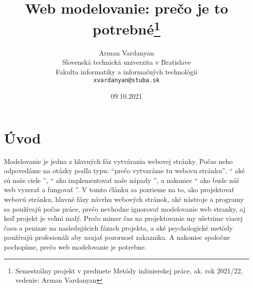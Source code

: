 \documentclass[10pt,twoside,slovak,a4paper]{article}
\title{Web modelovanie: prečo je to potrebné\thanks{Semestrálny projekt v predmete Metódy inžinierskej práce, ak. rok 2021/22, vedenie: Arman Vardanyan}} %
\author{Arman Vardanyan\\[2pt]
	{\small Slovenská technická univerzita v Bratislave}\\
	{\small Fakulta informatiky a informačných technológií}\\
	{\small \texttt{xvardanyan@stuba.sk}}
	}
\date{\small 09.10.2021} %
\begin{document}
\maketitle

\begin{center}
    
\end{center}

\section{Úvod}

Modelovanie je jedna z hlavných fáz vytvárania webovej stránky. Počas neho odpovedáme na otázky podľa typu: “prečo vytvaráme tu webovu stránku”, “ aké sú naše ciele ”, “ ako implementovať naše nápady ”, a nakoniec “ ako bude náš web vyzerať a fungovať ”. V tomto článku sa pozrieme na to, ako projektovať webovú stránku, hlavné fázy návrhu webových stránok, aké nástroje a programy sa používajú počas práce, prečo nevhodne ignorovať modelovanie web stranky, aj keď projekt je veľmi malý. Prečo minuv čas na projektovanie my ušetrime viacej času a peniaze na nasledujúcich fázach projekta, a aké psychologické metódy používajú profesionáli aby zaujať pozornosť zakaznika. A nakoniec spoločne pochopíme, prečo web modelovanie je potrebne.
\end{document}
